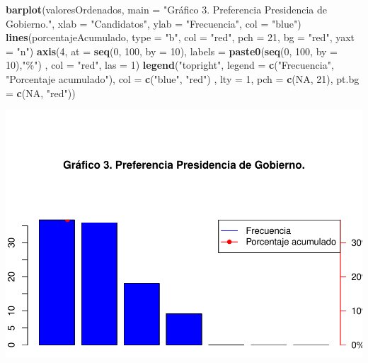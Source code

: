 \documentclass[
]{article}
\newenvironment{Shaded}{\begin{snugshade}}{\end{snugshade}}
\newcommand{\AttributeTok}[1]{\textcolor[rgb]{0.13,0.29,0.53}{#1}}
\newcommand{\ConstantTok}[1]{\textcolor[rgb]{0.56,0.35,0.01}{#1}}
\newcommand{\DecValTok}[1]{\textcolor[rgb]{0.00,0.00,0.81}{#1}}
\newcommand{\FunctionTok}[1]{\textcolor[rgb]{0.13,0.29,0.53}{\textbf{#1}}}
\newcommand{\NormalTok}[1]{#1}
\newcommand{\StringTok}[1]{\textcolor[rgb]{0.31,0.60,0.02}{#1}}
\begin{document}
\begin{Shaded}
\begin{Highlighting}[]
\FunctionTok{barplot}\NormalTok{(valoresOrdenados, }\AttributeTok{main =} \StringTok{"Gráfico 3. Preferencia Presidencia de Gobierno."}\NormalTok{, }
        \AttributeTok{xlab =} \StringTok{"Candidatos"}\NormalTok{, }\AttributeTok{ylab =} \StringTok{"Frecuencia"}\NormalTok{, }\AttributeTok{col =} \StringTok{"blue"}\NormalTok{)}
        \FunctionTok{lines}\NormalTok{(porcentajeAcumulado, }
                \AttributeTok{type =} \StringTok{"b"}\NormalTok{, }\AttributeTok{col =} \StringTok{"red"}\NormalTok{, }\AttributeTok{pch =} \DecValTok{21}\NormalTok{, }\AttributeTok{bg =} \StringTok{"red"}\NormalTok{, }\AttributeTok{yaxt =} \StringTok{"n"}\NormalTok{)}
        \FunctionTok{axis}\NormalTok{(}\DecValTok{4}\NormalTok{, }\AttributeTok{at =} \FunctionTok{seq}\NormalTok{(}\DecValTok{0}\NormalTok{, }\DecValTok{100}\NormalTok{, }\AttributeTok{by =} \DecValTok{10}\NormalTok{), }\AttributeTok{labels =} \FunctionTok{paste0}\NormalTok{(}\FunctionTok{seq}\NormalTok{(}\DecValTok{0}\NormalTok{, }\DecValTok{100}\NormalTok{, }\AttributeTok{by =} \DecValTok{10}\NormalTok{),}\StringTok{"\%"}\NormalTok{)}
\NormalTok{              , }\AttributeTok{col =} \StringTok{"red"}\NormalTok{, }\AttributeTok{las =} \DecValTok{1}\NormalTok{)}
\FunctionTok{legend}\NormalTok{(}\StringTok{"topright"}\NormalTok{, }\AttributeTok{legend =} \FunctionTok{c}\NormalTok{(}\StringTok{"Frecuencia"}\NormalTok{, }\StringTok{"Porcentaje acumulado"}\NormalTok{), }\AttributeTok{col =} \FunctionTok{c}\NormalTok{(}\StringTok{"blue"}\NormalTok{, }\StringTok{"red"}\NormalTok{)}
\NormalTok{       , }\AttributeTok{lty =} \DecValTok{1}\NormalTok{, }\AttributeTok{pch =} \FunctionTok{c}\NormalTok{(}\ConstantTok{NA}\NormalTok{, }\DecValTok{21}\NormalTok{), }\AttributeTok{pt.bg =} \FunctionTok{c}\NormalTok{(}\ConstantTok{NA}\NormalTok{, }\StringTok{"red"}\NormalTok{))}
\end{Highlighting}
\end{Shaded}

\includegraphics{preferenciaPte_files/figure-latex/graficoPareto-1.pdf}
\end{document}
